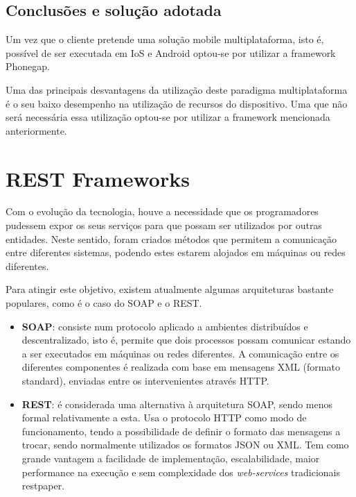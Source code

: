 \subsection{Conclusões e solução adotada}



Um vez que o cliente pretende uma solução mobile multiplataforma, isto é, possível de ser executada em IoS e Android optou-se por utilizar a framework Phonegap. 



Uma das principais desvantagens da utilização deste paradigma multiplataforma é o seu baixo desempenho na utilização de recursos do dispositivo. Uma que não será necessária essa utilização optou-se por utilizar a framework mencionada anteriormente. 



\newpage
\section{REST Frameworks}


Com o evolução da tecnologia, houve a necessidade que os programadores pudessem expor os seus serviços para que possam ser utilizados por outras entidades. Neste sentido, foram criados métodos que permitem a comunicação  entre diferentes sistemas, podendo estes estarem alojados em máquinas ou redes diferentes.   

Para atingir este objetivo, existem atualmente algumas arquiteturas bastante populares, como é o caso do \ac{SOAP} e o \ac{REST}. 


\begin{itemize}
	\item \textbf{\ac{SOAP}}: consiste num protocolo aplicado a ambientes distribuídos e descentralizado, isto é, permite que dois processos possam comunicar estando a ser executados em máquinas ou redes diferentes\cite{Kang2015}. A comunicação entre os diferentes componentes é realizada com base em mensagens \ac{XML} (formato standard), enviadas entre os intervenientes através \ac{HTTP}.
	
	
	\item \textbf{\ac{REST}}: é considerada uma alternativa à arquitetura \ac{SOAP}, sendo menos formal relativamente a esta. Usa o protocolo \ac{HTTP} como modo de funcionamento, tendo a possibilidade de definir o formato das mensagens a trocar, sendo normalmente utilizados os formatos \ac{JSON} ou \ac{XML}. Tem como grande vantagem a facilidade de implementação, escalabilidade, maior performance na execução e sem complexidade dos \textit{web-services} tradicionais \ac{restpaper}. 
	
	
\end{itemize}


